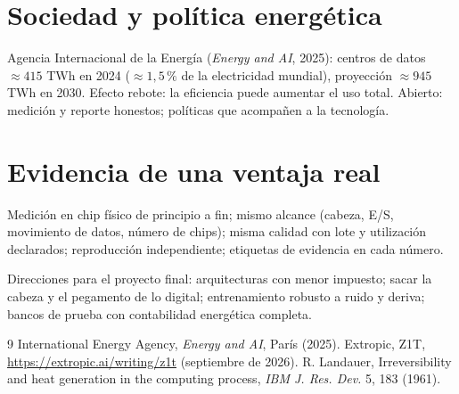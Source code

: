 \documentclass[11pt,a4paper]{article}
\begin{document}
\section{Sociedad y política energética \evP}
Agencia Internacional de la Energía (\emph{Energy and AI}, 2025): centros de datos $\approx415$ TWh en 2024 ($\approx1{,}5\,\%$ de la electricidad mundial), proyección
$\approx945$ TWh en 2030. Efecto rebote: la eficiencia puede aumentar el uso total. Abierto: medición y reporte honestos; políticas que acompañen a la tecnología.

\section{Evidencia de una ventaja real}
Medición en chip físico de principio a fin; mismo alcance (cabeza, E/S, movimiento de datos, número de chips); misma calidad con lote y utilización declarados;
reproducción independiente; etiquetas de evidencia en cada número.

\begin{aplicacion}
Direcciones para el proyecto final: arquitecturas con menor impuesto; sacar la cabeza y el pegamento de lo digital; entrenamiento robusto a ruido y deriva; bancos de prueba
con contabilidad energética completa.
\end{aplicacion}

\begin{thebibliography}{9}\small
{} International Energy Agency, \emph{Energy and AI}, París (2025).
 Extropic, Z1T, \url{https://extropic.ai/writing/z1t} (septiembre de 2026).
 R. Landauer, Irreversibility and heat generation in the computing process, \emph{IBM J. Res. Dev.} 5, 183 (1961).
\end{thebibliography}
\end{document}
